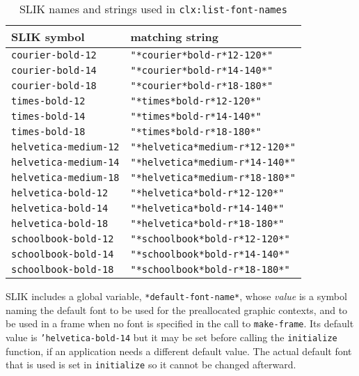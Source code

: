 \documentclass[twoside,openright,11pt]{report}
\newcommand{\tp}[1]{\texttt{#1}}
\begin{document}
\begin{table}[htb]
\centering
\begin{tabular}{|l|l|} \hline
SLIK symbol & matching string \\ \hline \hline
\tp{courier-bold-12} & \tp{"*courier*bold-r*12-120*"} \\ \hline
\tp{courier-bold-14} & \tp{"*courier*bold-r*14-140*"} \\ \hline
\tp{courier-bold-18} & \tp{"*courier*bold-r*18-180*"} \\ \hline
\tp{times-bold-12} & \tp{"*times*bold-r*12-120*"} \\ \hline
\tp{times-bold-14} & \tp{"*times*bold-r*14-140*"} \\ \hline
\tp{times-bold-18} & \tp{"*times*bold-r*18-180*"} \\ \hline
\tp{helvetica-medium-12} & \tp{"*helvetica*medium-r*12-120*"} \\ \hline
\tp{helvetica-medium-14} & \tp{"*helvetica*medium-r*14-140*"} \\ \hline
\tp{helvetica-medium-18} & \tp{"*helvetica*medium-r*18-180*"} \\ \hline
\tp{helvetica-bold-12} & \tp{"*helvetica*bold-r*12-120*"} \\ \hline
\tp{helvetica-bold-14} & \tp{"*helvetica*bold-r*14-140*"} \\ \hline
\tp{helvetica-bold-18} & \tp{"*helvetica*bold-r*18-180*"} \\ \hline
\tp{schoolbook-bold-12} & \tp{"*schoolbook*bold-r*12-120*"} \\ \hline
\tp{schoolbook-bold-14} & \tp{"*schoolbook*bold-r*14-140*"} \\ \hline
\tp{schoolbook-bold-18} & \tp{"*schoolbook*bold-r*18-180*"} \\ \hline
\end{tabular}
\caption{SLIK names and strings used in \tp{clx:list-font-names}
\label{tab:fonts}} 
\end{table}

SLIK includes a global variable, \tp{*default-font-name*}, whose
\emph{value} is a symbol naming the default font to be used for the
preallocated graphic contexts, and to be used in a frame when no font
is specified in the call to \tp{make-frame}.  Its default value is
\tp{'helvetica-bold-14} but it may be set before calling the
\tp{initialize} function, if an application needs a different default
value.  The actual default font that is used is set in \tp{initialize}
so it cannot be changed afterward.
\end{document}
